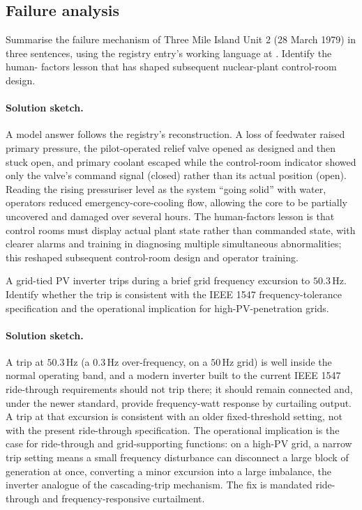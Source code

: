 \subsection*{Failure analysis}

\begin{exercise}
Summarise the failure mechanism of Three Mile Island Unit 2
(28 March 1979) in three sentences, using the registry entry's
working language at \cite{acc:kemeny-tmi-1979}. Identify the human-
factors lesson that has shaped subsequent nuclear-plant control-room
design.
\paragraph{Solution sketch.}
A model answer follows the registry's reconstruction. A loss of
feedwater raised primary pressure, the pilot-operated relief valve
opened as designed and then stuck open, and primary coolant escaped
while the control-room indicator showed only the valve's command signal
(closed) rather than its actual position (open). Reading the rising
pressuriser level as the system ``going solid'' with water, operators
reduced emergency-core-cooling flow, allowing the core to be partially
uncovered and damaged over several hours. The human-factors lesson is
that control rooms must display actual plant state rather than commanded
state, with clearer alarms and training in diagnosing multiple
simultaneous abnormalities; this reshaped subsequent control-room design
and operator training.
\end{exercise}

\begin{exercise}
A grid-tied PV inverter trips during a brief grid frequency
excursion to $50.3\,\si{\hertz}$. Identify whether the trip is
consistent with the IEEE 1547 frequency-tolerance specification
and the operational implication for high-PV-penetration grids.
\paragraph{Solution sketch.}
A trip at $50.3\,\si{\hertz}$ (a $0.3\,\si{\hertz}$ over-frequency, on a
$50\,\si{\hertz}$ grid) is well inside the normal operating band, and a
modern inverter built to the current IEEE 1547 ride-through requirements
should not trip there; it should remain connected and, under the newer
standard, provide frequency-watt response by curtailing output. A trip
at that excursion is consistent with an older fixed-threshold setting,
not with the present ride-through specification. The operational
implication is the case for ride-through and grid-supporting functions:
on a high-PV grid, a narrow trip setting means a small frequency
disturbance can disconnect a large block of generation at once,
converting a minor excursion into a large imbalance, the inverter
analogue of the cascading-trip mechanism. The fix is mandated
ride-through and frequency-responsive curtailment.
\end{exercise}

